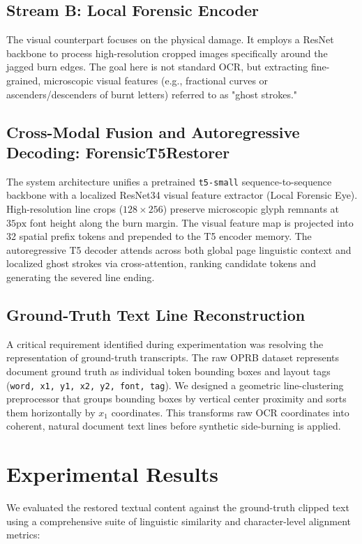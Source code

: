 \documentclass{article}
\begin{document}
\subsection{Stream B: Local Forensic Encoder}
The visual counterpart focuses on the physical damage. It employs a ResNet backbone to process high-resolution cropped images specifically around the jagged burn edges. The goal here is not standard OCR, but extracting fine-grained, microscopic visual features (e.g., fractional curves or ascenders/descenders of burnt letters) referred to as "ghost strokes."

\subsection{Cross-Modal Fusion and Autoregressive Decoding: ForensicT5Restorer}
The system architecture unifies a pretrained \texttt{t5-small} sequence-to-sequence backbone with a localized ResNet34 visual feature extractor (Local Forensic Eye). High-resolution line crops ($128 \times 256$) preserve microscopic glyph remnants at $35\text{px}$ font height along the burn margin. The visual feature map is projected into 32 spatial prefix tokens and prepended to the T5 encoder memory. The autoregressive T5 decoder attends across both global page linguistic context and localized ghost strokes via cross-attention, ranking candidate tokens and generating the severed line ending.

\subsection{Ground-Truth Text Line Reconstruction}
A critical requirement identified during experimentation was resolving the representation of ground-truth transcripts. The raw OPRB dataset represents document ground truth as individual token bounding boxes and layout tags (\texttt{word, x1, y1, x2, y2, font, tag}). We designed a geometric line-clustering preprocessor that groups bounding boxes by vertical center proximity and sorts them horizontally by $x_1$ coordinates. This transforms raw OCR coordinates into coherent, natural document text lines before synthetic side-burning is applied.

\section{Experimental Results}
We evaluated the restored textual content against the ground-truth clipped text using a comprehensive suite of linguistic similarity and character-level alignment metrics:
\end{document}
